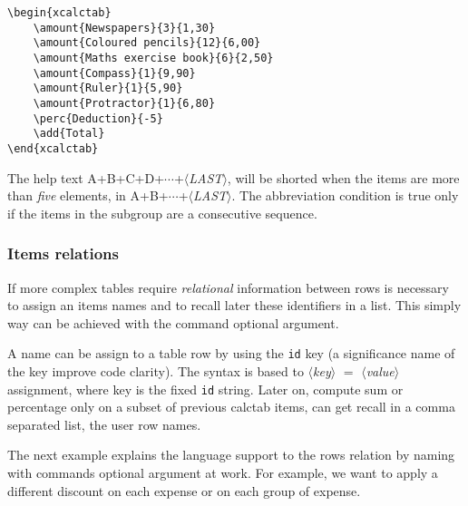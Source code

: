 \documentclass[a4paper]{article}
\newcommand{\pkg}[1]{\textsf{#1}}
\newcommand{\meta}[1]{\ensuremath{\langle}\emph{#1}\ensuremath{\rangle}}
\begin{document}
\begin{xcalctab}
\end{xcalctab}

\begin{Verbatim}
\begin{xcalctab}
    \amount{Newspapers}{3}{1,30}
    \amount{Coloured pencils}{12}{6,00}
    \amount{Maths exercise book}{6}{2,50}
    \amount{Compass}{1}{9,90}
    \amount{Ruler}{1}{5,90}
    \amount{Protractor}{1}{6,80}
    \perc{Deduction}{-5}
    \add{Total}
\end{xcalctab}
\end{Verbatim}

The help text A+B+C+D+$\cdots$+\meta{LAST}, will be shorted when the items are more than \emph{five} elements, in A+B+$\cdots$+\meta{LAST}. The abbreviation condition is true only if the items in the subgroup are a consecutive sequence.

%
%
%
\subsubsection{Items relations}
If more complex tables require \emph{relational} information between rows is necessary to assign an items names and to recall later these identifiers in a list. This simply way can be achieved with the command optional argument.

A name can be assign to a table row by using the \texttt{id} key (a significance name of the key improve code clarity). The syntax is based to \meta{key} $=$ \meta{value} assignment, where key is the fixed \texttt{id} string. Later on, compute sum or percentage only on a subset of previous \pkg{calctab} items, can get recall in a comma separated list, the user row names.

The next example explains the language support to the rows relation by naming with commands optional argument at work. For example, we want to apply a different discount on each expense or on each group of expense.

\begin{calctab}
\end{calctab}
\end{document}
